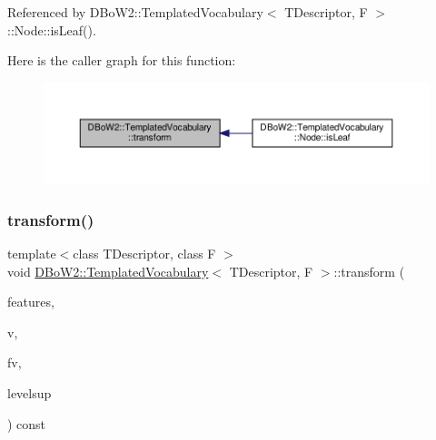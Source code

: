 Referenced by D\+Bo\+W2\+::\+Templated\+Vocabulary$<$ T\+Descriptor, F $>$\+::\+Node\+::is\+Leaf().

Here is the caller graph for this function\+:\nopagebreak
\begin{figure}[H]
\begin{center}
\leavevmode
\includegraphics[width=350pt]{classDBoW2_1_1TemplatedVocabulary_a01de3bebec37624439c7d3baf6651ff0_icgraph}
\end{center}
\end{figure}
\mbox{\label{classDBoW2_1_1TemplatedVocabulary_af3815440ed610974afc5a2836f54fe07}} 
\subsubsection{\texorpdfstring{transform()}{transform()}\hspace{0.1cm}{\footnotesize\ttfamily [2/5]}}
{\footnotesize\ttfamily template$<$class T\+Descriptor, class F $>$ \\
void \hyperlink{classDBoW2_1_1TemplatedVocabulary}{D\+Bo\+W2\+::\+Templated\+Vocabulary}$<$ T\+Descriptor, F $>$\+::transform (\begin{DoxyParamCaption}\item[{const std\+::vector$<$ T\+Descriptor $>$ \&}]{features,  }\item[{\hyperlink{classDBoW2_1_1BowVector}{Bow\+Vector} \&}]{v,  }\item[{\hyperlink{classDBoW2_1_1FeatureVector}{Feature\+Vector} \&}]{fv,  }\item[{int}]{levelsup }\end{DoxyParamCaption}) const\hspace{0.3cm}{\ttfamily [virtual]}}

